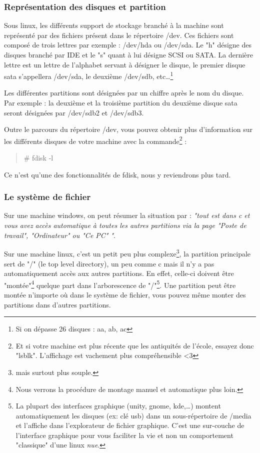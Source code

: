 \documentclass[a4paper,11pt]{article}
\newcommand{\commande}[1] {
    \begin{quote}
    \tt\raggedright #1 
    \end{quote}
}
\begin{document}
\subsubsection{Représentation des disques et partition}
\par Sous linux, les différents support de stockage branché à la machine sont représenté par des fichiers présent dans le répertoire /dev. Ces fichiers sont composé de trois lettres par exemple : /dev/hda ou /dev/sda. Le "h" désigne des disques branché par IDE et le "s" quant à lui désigne SCSI ou SATA. La dernière lettre est un lettre de l'alphabet servant à désigner le disque, le premier disque sata s'appellera /dev/sda, le deuxième /dev/sdb, etc\dots\footnote{Si on dépasse 26 disques : aa, ab, ac}
\par Les différentes partitions sont désignées par un chiffre après le nom du disque. Par exemple : la deuxième et la troisième partition du deuxième disque sata seront désignées par /dev/sdb2 et /dev/sdb3.
\par Outre le parcours du répertoire /dev, vous pouvez obtenir plus d'information sur les différents disques de votre machine avec la commande\footnote{Et si votre machine est plus récente que les antiquités de l'école, essayez donc "lsblk". L'affichage est vachement plus compréhensible <3} :
\commande{\# fdisk -l}
\par Ce n'est qu'une des fonctionnalités de fdisk, nous y reviendrons plus tard.
 
\subsubsection{Le système de fichier}
\par Sur une machine windows, on peut résumer la situation par : \emph{"tout est dans c et vous avez accès automatique à toutes les autres partitions via la page "Poste de travail", "Ordinateur" ou "Ce PC" "}.
\par Sur une machine linux, c'est un petit peu plus complexe\footnote{mais surtout plus souple.}, la partition principale sert de "/" (le top level directory), un peu comme c mais il n'y a pas automatiquement accès aux autres partitions. En effet, celle-ci doivent être "montée"\footnote{Nous verrons la procédure de montage manuel et automatique plus loin.} quelque part dans l'arborescence de "/"\footnote{La plupart des interfaces graphique (unity, gnome, kde,\dots) montent automatiquement les disques (ex: clé usb) dans un sous-répertoire de /media et l'affiche dans l'explorateur de fichier graphique. C'est une sur-couche de l'interface graphique pour vous faciliter la vie et non un comportement "classique" d'une linux \emph{nue}.}. Une partition peut être montée n'importe où dans le système de fichier, vous pouvez même monter des partitions dans d'autres partitions.
\end{document}
